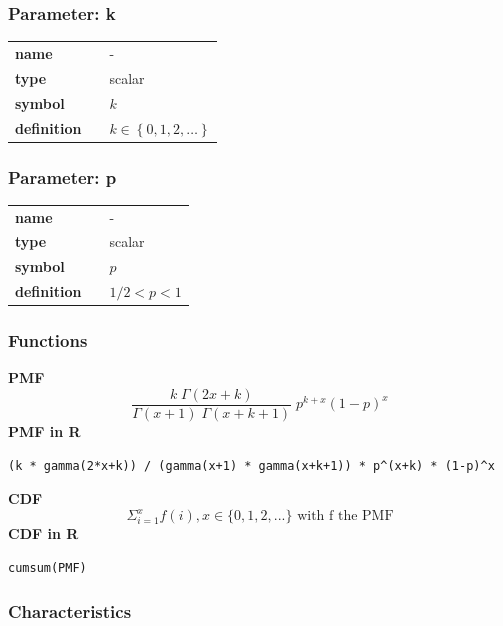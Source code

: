 \subsubsection*{Parameter: k}

\noindent\begin{tabular}{p{2cm}cl}
\textbf{name} & & - \\
\textbf{type} & & scalar \\
\textbf{symbol} & & $k$  \\
\textbf{definition} & & $k \in \left\{0,1,2,\dots\right\}$
\end{tabular}
\subsubsection*{Parameter: p}

\noindent\begin{tabular}{p{2cm}cl}
\textbf{name} & & - \\
\textbf{type} & & scalar \\
\textbf{symbol} & & $p$  \\
\textbf{definition} & & $1/2 < p < 1$
\end{tabular}
\subsubsection*{Functions}

\smallskip \noindent \hspace{.2cm} \textbf{PMF} 
\begin{equation*}\frac{k \; \Gamma(2x + k)}{\Gamma(x+1) \;\Gamma(x + k + 1)}  \; p^{k+x} (1-p)^x \end{equation*}
\smallskip \noindent \hspace{.2cm} \textbf{PMF in R}  
\begin{verbatim}(k * gamma(2*x+k)) / (gamma(x+1) * gamma(x+k+1)) * p^(x+k) * (1-p)^x\end{verbatim}
\smallskip \noindent \hspace{.2cm} \textbf{CDF} 
\begin{equation*}\Sigma_{i=1}^x f(i), x \in \{0,1,2,...\}
\text { with f the PMF}\end{equation*}
\smallskip \noindent \hspace{.2cm} \textbf{CDF in R}  
\begin{verbatim}
cumsum(PMF)
\end{verbatim}

\smallskip
\subsubsection*{Characteristics}
\smallskip
